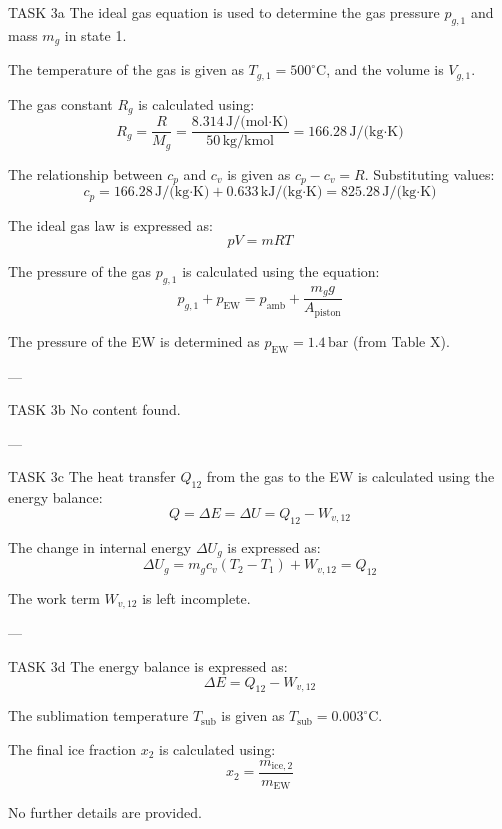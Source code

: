 TASK 3a  
The ideal gas equation is used to determine the gas pressure \( p_{g,1} \) and mass \( m_g \) in state 1.  

The temperature of the gas is given as \( T_{g,1} = 500^\circ\text{C} \), and the volume is \( V_{g,1} \).  

The gas constant \( R_g \) is calculated using:  
\[
R_g = \frac{R}{M_g} = \frac{8.314 \, \text{J/(mol·K)}}{50 \, \text{kg/kmol}} = 166.28 \, \text{J/(kg·K)}
\]  

The relationship between \( c_p \) and \( c_v \) is given as \( c_p - c_v = R \). Substituting values:  
\[
c_p = 166.28 \, \text{J/(kg·K)} + 0.633 \, \text{kJ/(kg·K)} = 825.28 \, \text{J/(kg·K)}
\]  

The ideal gas law is expressed as:  
\[
pV = mRT
\]  

The pressure of the gas \( p_{g,1} \) is calculated using the equation:  
\[
p_{g,1} + p_{\text{EW}} = p_{\text{amb}} + \frac{m_g g}{A_{\text{piston}}}
\]  

The pressure of the EW is determined as \( p_{\text{EW}} = 1.4 \, \text{bar} \) (from Table X).  

---

TASK 3b  
No content found.  

---

TASK 3c  
The heat transfer \( Q_{12} \) from the gas to the EW is calculated using the energy balance:  
\[
Q = \Delta E = \Delta U = Q_{12} - W_{v,12}
\]  

The change in internal energy \( \Delta U_g \) is expressed as:  
\[
\Delta U_g = m_g c_v (T_2 - T_1) + W_{v,12} = Q_{12}
\]  

The work term \( W_{v,12} \) is left incomplete.  

---

TASK 3d  
The energy balance is expressed as:  
\[
\Delta E = Q_{12} - W_{v,12}
\]  

The sublimation temperature \( T_{\text{sub}} \) is given as \( T_{\text{sub}} = 0.003^\circ\text{C} \).  

The final ice fraction \( x_2 \) is calculated using:  
\[
x_2 = \frac{m_{\text{ice},2}}{m_{\text{EW}}}
\]  

No further details are provided.  